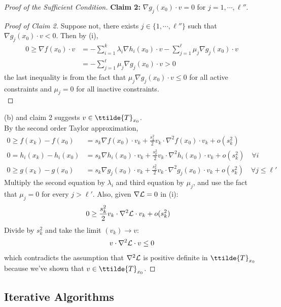 \documentclass{article}
\begin{document}
\begin{proof}[Proof of the Sufficient Condition]
		\textbf{Claim 2:} $\nabla g_j(x_0) \cdot v = 0$ for $j = 1, \cdots, \ell''$.
		\begin{proof}[Proof of Claim 2]
			Suppose not, there exists $j \in \{1, \cdots, \ell''\}$ such that $\nabla g_j(x_0) \cdot v < 0$. Then by (i),
			\begin{align}
				0 \geq \nabla f(x_0) \cdot v &= - \sum_{i=1}^k \lambda_i \nabla h_i(x_0) \cdot v - \sum_{j=1}^{\ell} \mu_j \nabla g_j(x_0) \cdot v \\
				&= - \sum_{j=1}^{\ell} \mu_j \nabla g_j(x_0) \cdot v > 0
			\end{align}
			the last inequality is from the fact that $\mu_j \nabla g_j (x_0) \cdot v \leq 0$ for all active constraints and $\mu_j = 0$ for all inactive constraints. \\
		\end{proof}
		(b) and claim 2 suggests $v \in \ttilde{T}_{x_0}$. \\
		By the second order Taylor approximation,
		\begin{align}
			0 \geq f(x_k) - f(x_0) &= s_k \nabla f(x_0)\cdot v_k + \frac{s_k^2}{2} v_k \cdot \nabla^2 f(x_0) \cdot v_k + o(s_k^2) \\
			0 = h_i(x_k) - h_i(x_0) &= s_k \nabla h_i(x_0)\cdot v_k + \frac{s_k^2}{2} v_k \cdot \nabla^2 h_i(x_0) \cdot v_k + o(s_k^2)\quad \forall i\\
			0 \geq g(x_k) - g(x_0) &= s_k \nabla g_j(x_0)\cdot v_k + \frac{s_k^2}{2} v_k \cdot \nabla^2 g_j(x_0) \cdot v_k + o(s_k^2)\quad \forall j \leq \ell'
		\end{align}
		Multiply the second equation by $\lambda_i$ and third equation by $\mu_j$, and use the fact that $\mu_j = 0$ for every $j > \ell'$. Also, given $\nabla \mathcal{{L}} = 0$ in (i): 
		\begin{align}
			0 &\geq \frac{s_k^2}{2} v_k \cdot \nabla^2 \mathcal{{L}} \cdot v_k + o(s_k^2)
		\end{align}
		Divide by $s_k^2$ and take the limit $(v_k) \to v$:
		\begin{align}
			v\cdot \nabla^2 \mathcal{{L}}\cdot v \leq 0
		\end{align}
		which contradicts the assumption that $\nabla^2 \mathcal{{L}}$ is positive definite in $\ttilde{T}_{x_0}$ because we've shown that $v \in \ttilde{T}_{x_0}$.
	\end{proof}
	\subsection{Iterative Algorithms}
\end{document}
